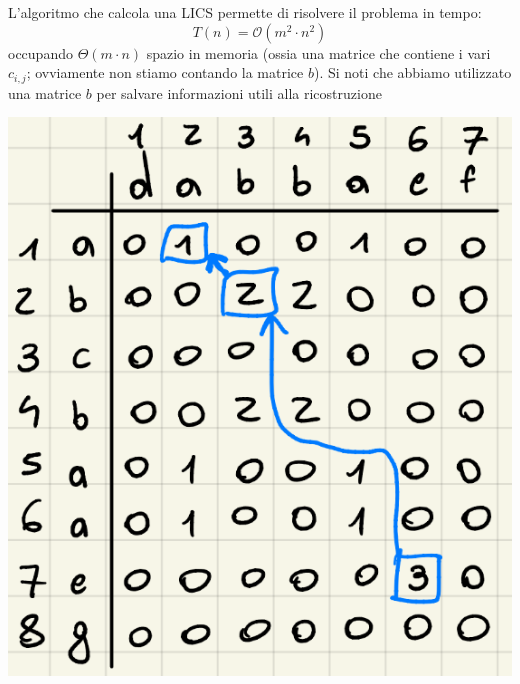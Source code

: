 \documentclass[12pt]{article}
\begin{document}
L'algoritmo che calcola una LICS permette di risolvere il problema in tempo:
$$T(n) = \mathcal{O}(m^2 \cdot n^2)$$
occupando $\Theta(m \cdot n)$ spazio in memoria (ossia una matrice che contiene i vari $c_{i,j}$; ovviamente non stiamo contando la matrice $b$).
Si noti che abbiamo utilizzato una matrice $b$ per salvare informazioni utili alla ricostruzione
\begin{center}
    \includegraphics[width = 0.40\linewidth]{Images/10.png}
\end{center}
\end{document}
